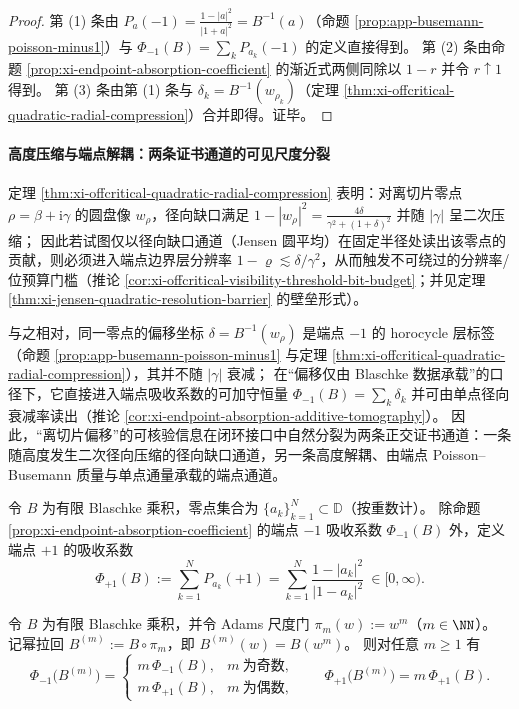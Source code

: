 \begin{proof}
第 (1) 条由 \(P_{a}(-1)=\frac{1-|a|^2}{|1+a|^2}=B^{-1}(a)\)（命题 \ref{prop:app-busemann-poisson-minus1}）与 \(\Phi_{-1}(B)=\sum_k P_{a_k}(-1)\) 的定义直接得到。
第 (2) 条由命题 \ref{prop:xi-endpoint-absorption-coefficient} 的渐近式两侧同除以 \(1-r\) 并令 \(r\uparrow 1\) 得到。
第 (3) 条由第 (1) 条与 \(\delta_k=B^{-1}(w_{\rho_k})\)（定理 \ref{thm:xi-offcritical-quadratic-radial-compression}）合并即得。证毕。
\end{proof}

\paragraph{高度压缩与端点解耦：两条证书通道的可见尺度分裂}
定理 \ref{thm:xi-offcritical-quadratic-radial-compression} 表明：对离切片零点 \(\rho=\beta+\mathrm{i}\gamma\) 的圆盘像 \(w_\rho\)，径向缺口满足
\(
1-|w_\rho|^2=\frac{4\delta}{\gamma^2+(1+\delta)^2}
\)
并随 \(|\gamma|\) 呈二次压缩；
因此若试图仅以径向缺口通道（Jensen 圆平均）在固定半径处读出该零点的贡献，则必须进入端点边界层分辨率 \(1-\varrho\lesssim \delta/\gamma^2\)，从而触发不可绕过的分辨率/位预算门槛（推论 \ref{cor:xi-offcritical-visibility-threshold-bit-budget}；并见定理 \ref{thm:xi-jensen-quadratic-resolution-barrier} 的壁垒形式）。
\par
与之相对，同一零点的偏移坐标 \(\delta=B^{-1}(w_\rho)\) 是端点 \(-1\) 的 horocycle 层标签（命题 \ref{prop:app-busemann-poisson-minus1} 与定理 \ref{thm:xi-offcritical-quadratic-radial-compression}），其并不随 \(|\gamma|\) 衰减；
在“偏移仅由 Blaschke 数据承载”的口径下，它直接进入端点吸收系数的可加守恒量 \(\Phi_{-1}(B)=\sum_k \delta_k\) 并可由单点径向衰减率读出（推论 \ref{cor:xi-endpoint-absorption-additive-tomography}）。
因此，“离切片偏移”的可核验信息在闭环接口中自然分裂为两条正交证书通道：一条随高度发生二次径向压缩的径向缺口通道，另一条高度解耦、由端点 Poisson--Busemann 质量与单点通量承载的端点通道。

\begin{definition}[两端点吸收系数]\label{def:xi-endpoint-two-absorption-coefficients}
令 \(B\) 为有限 Blaschke 乘积，零点集合为 \(\{a_k\}_{k=1}^{N}\subset\mathbb{D}\)（按重数计）。
除命题 \ref{prop:xi-endpoint-absorption-coefficient} 的端点 \(-1\) 吸收系数 \(\Phi_{-1}(B)\) 外，定义端点 \(+1\) 的吸收系数
\[
\Phi_{+1}(B):=\sum_{k=1}^{N}P_{a_k}(+1)=\sum_{k=1}^{N}\frac{1-|a_k|^2}{|1-a_k|^2}\ \in[0,\infty).
\]
\end{definition}

\begin{theorem}\label{thm:xi-endpoint-absorption-adams-rescaling}
令 \(B\) 为有限 Blaschke 乘积，并令 Adams 尺度门 \(\pi_m(w):=w^m\)（\(m\in\NN\)）。
记幂拉回 \(B^{(m)}:=B\circ\pi_m\)，即 \(B^{(m)}(w)=B(w^m)\)。
则对任意 \(m\ge 1\) 有
\[
\boxed{\;
\Phi_{-1}\bigl(B^{(m)}\bigr)=
\begin{cases}
m\,\Phi_{-1}(B),& m\ \text{为奇数},\\[2pt]
m\,\Phi_{+1}(B),& m\ \text{为偶数},
\end{cases}
\qquad
\Phi_{+1}\bigl(B^{(m)}\bigr)=m\,\Phi_{+1}(B).\;}
\]
\end{theorem}

